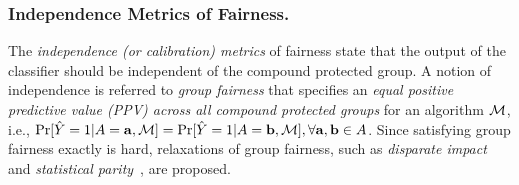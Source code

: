 \begin{comment}
$ X $ is the set of non-protected attributes. Each non-protected attribute $ x_i \in X $ takes the valuation as real numbers or categories. 
We consider a multi-protected attributes setting where $ A $ is the set of protected (or sensitive) attributes. Each protected attribute $ a_i \in A $ is a categorical attribute with at least two categories.  
$ y $ is the binary class label of the data sample. 

Based on the valuation of the protected attributes, the samples are  tagged as being in different protected groups, i.e., 
the privileged group(s)  and the unprivileged group(s). For instance, let the dataset contain two protected attributes:  race and gender. The attribute race can be white, black or Asian and the attribute gender can be male or female. For simplicity, we assume that the protected group white-male is the most privileged group and all other protected groups (attribute combinations) refer to unprivileged groups with black-female being the most unprivileged group. Generally the dataset contains bias that results in the discrimination between the privileged and unprivileged groups. In this paper, we do not require the knowledge of privileged and unprivileged groups beforehand. We instead ask for the set $ A $ of protected attributes from which we derive privileged and unprivileged groups. 
\end{comment}



\begin{comment}
We now consider a more specific setting where the samples are divided into privileged and unprivileged groups based on the valuation of $ a $, i.e, when $ a=1 $, the sample is included into a privileged group and vice versa. 
\end{comment}


\subsubsection{Independence Metrics of Fairness.} 
The \textit{independence (or calibration) metrics} of fairness state that the output of the classifier should be independent of the compound protected group.
A notion of independence is referred to \textit{group fairness} that specifies an \textit{equal positive predictive value (PPV) across all compound protected groups} for an algorithm $\mathcal{M}$, i.e., $\Pr[\hat{Y} = 1 | A = \mathbf{a}, \mathcal{M}] = \Pr [\hat{Y} =1 | A = \mathbf{b}, \mathcal{M}], \forall \mathbf{a}, \mathbf{b} \in A$.
Since satisfying group fairness exactly is hard, relaxations of group fairness, such as \textit{disparate impact} and \textit{statistical parity}~\cite{dwork2012fairness,feldman2015certifying}, are proposed. 

